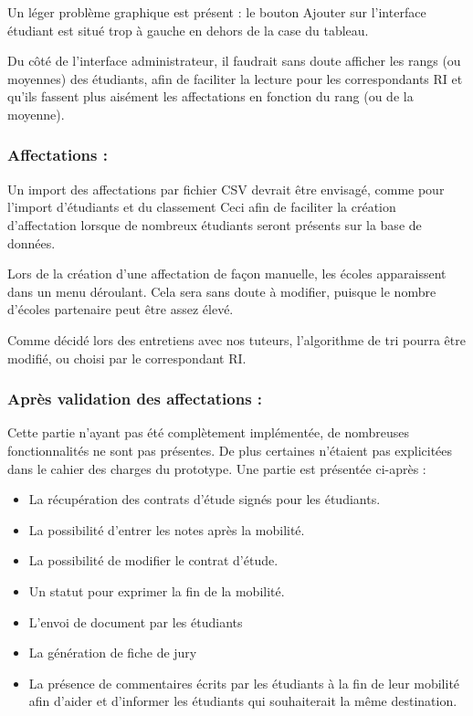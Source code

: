 Un léger problème graphique est présent : le bouton \og Ajouter \fg{} sur l'interface étudiant est situé trop à gauche en dehors de la case du tableau.

Du côté de l'interface administrateur, il faudrait sans doute afficher les rangs (ou moyennes) des étudiants, afin de faciliter la lecture pour les correspondants RI et qu'ils fassent plus aisément les affectations en fonction du rang (ou de la moyenne).


\subsubsection{Affectations :}
Un import des affectations par fichier CSV devrait être envisagé, comme pour l'import d'étudiants et du classement Ceci afin de faciliter la création d'affectation lorsque de nombreux étudiants seront présents sur la base de données.

Lors de la création d'une affectation de façon manuelle, les écoles apparaissent dans un menu déroulant. Cela sera sans doute à modifier, puisque le nombre d'écoles partenaire peut être assez élevé.

Comme décidé lors des entretiens avec nos tuteurs, l'algorithme de tri pourra être modifié, ou choisi par le correspondant RI.


\subsubsection{Après validation des affectations :}
Cette partie n'ayant pas été complètement implémentée, de nombreuses fonctionnalités ne sont pas présentes. De plus certaines n'étaient pas explicitées dans le cahier des charges du prototype. Une partie est présentée ci-après :
\begin{itemize}
\item La récupération des contrats d'étude signés pour les étudiants.
\item La possibilité d'entrer les notes après la mobilité.
\item La possibilité de modifier le contrat d'étude.
\item Un statut pour exprimer la fin de la mobilité.
\item L'envoi de document par les étudiants
\item La génération de fiche de jury
\item La présence de commentaires écrits par les étudiants à la fin de leur mobilité afin d'aider et d'informer les étudiants qui souhaiterait la même destination.
\end{itemize}


